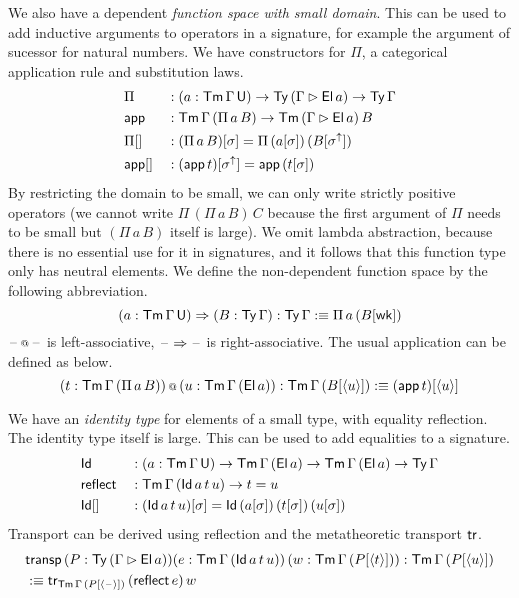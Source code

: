 \documentclass[acmsmall,screen]{acmart}
\begin{document}
We also have a dependent {\em function space with small domain}. This
can be used to add inductive arguments to operators in a signature,
for example the argument of sucessor for natural numbers. We have
constructors for $\Pi$, a categorical application rule and
substitution laws.
\begin{alignat*}{5}
  & \Pi && : (a:\mathsf{Tm}\,\Gamma\,\mathsf{U})\rightarrow\mathsf{Ty}\,(\Gamma\rhd\mathsf{El}\,a)\rightarrow\mathsf{Ty}\,\Gamma \\
  & \mathsf{app} && : \mathsf{Tm}\,\Gamma\,(\Pi\,a\,B)\rightarrow\mathsf{Tm}\,(\Gamma\rhd \mathsf{El}\,a)\,B \\
  & {\Pi[]} && : (\Pi\,a\,B)[\sigma] = \Pi\,(a[\sigma])\,(B[\sigma^\uparrow]) \\
  & {\mathsf{app}[]} && : (\mathsf{app}\,t)[\sigma^\uparrow] = \mathsf{app}\,(t[\sigma])
\end{alignat*}
By restricting the domain to be small, we can only write strictly
positive operators (we cannot write $\Pi\,(\Pi\,a\,B)\,C$ because the
first argument of $\Pi$ needs to be small but $(\Pi\,a\,B)$ itself is
large). We omit lambda abstraction, because there is no essential use
for it in signatures, and it follows that this function type only has
neutral elements. We define the non-dependent function space by the
following abbreviation.
\[
(a:\mathsf{Tm}\,\Gamma\,\mathsf{U})\Rightarrow(B:\mathsf{Ty}\,\Gamma) :\mathsf{Ty}\,\Gamma :\equiv \Pi\,a\,(B[\mathsf{wk}])
\]
$\mathord{\hspace{1pt}\text{--}\hspace{1pt}}\mathop{{\scriptstyle @}} \mathord{\hspace{1pt}\text{--}\hspace{1pt}}$ is left-associative, $\mathord{\hspace{1pt}\text{--}\hspace{1pt}}\Rightarrow\mathord{\hspace{1pt}\text{--}\hspace{1pt}}$ is
right-associative. The usual application can be defined as below.
\[
 (t:\mathsf{Tm}\,\Gamma\,(\Pi\,a\,B))\mathop{{\scriptstyle @}}\,(u : \mathsf{Tm}\,\Gamma\,(\mathsf{El}\,a)):\mathsf{Tm}\,\Gamma\,(B[\langle u\rangle]) :\equiv (\mathsf{app}\,t)[\langle u \rangle]
\]

We have an \emph{identity type} for elements of a small type, with
equality reflection. The identity type itself is large. This can be
used to add equalities to a signature.
\begin{alignat*}{5}
  & \mathsf{Id} && : (a:\mathsf{Tm}\,\Gamma\,\mathsf{U})\rightarrow\mathsf{Tm}\,\Gamma\,(\mathsf{El}\,a)\rightarrow\mathsf{Tm}\,\Gamma\,(\mathsf{El}\,a)\rightarrow\mathsf{Ty}\,\Gamma \\
  & \mathsf{reflect} && : \mathsf{Tm}\,\Gamma\,(\mathsf{Id}\,a\,t\,u)\rightarrow t = u \\
  & {\mathsf{Id}[]} && : (\mathsf{Id}\,a\,t\,u)[\sigma] = \mathsf{Id}\,(a[\sigma])\,(t[\sigma])\,(u[\sigma])
\end{alignat*}
Transport can be derived using reflection and the metatheoretic
transport $\mathsf{tr}$.
\begin{alignat*}{5}
  & \mathsf{transp}\,(P : \mathsf{Ty}\,(\Gamma \rhd \mathsf{El}\,a))(e:\mathsf{Tm}\,\Gamma\,(\mathsf{Id}\,a\,t\,u))\,(w:\mathsf{Tm}\,\Gamma\,(P[\langle t \rangle])):\mathsf{Tm}\,\Gamma\,(P[\langle u \rangle]) \\
  & :\equiv \mathsf{tr}_{\mathsf{Tm}\,\Gamma\,(P[\langle\mathord{\hspace{1pt}\text{--}\hspace{1pt}}\rangle])}\,(\mathsf{reflect}\,e)\,w
\end{alignat*}
\end{document}
